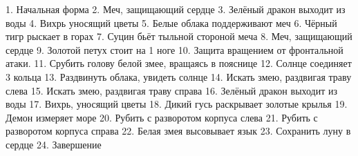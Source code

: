 1. Начальная форма
2. Меч, защищающий сердце
3. Зелёный дракон выходит из воды
4. Вихрь уносящий цветы
5. Белые облака поддерживают меч
6. Чёрный тигр рыскает в горах
7. Суцин бьёт тыльной стороной меча
8. Меч, защищающий сердце
9. Золотой петух стоит на 1 ноге
10. Защита вращением от фронтальной атаки.
11. Срубить голову белой змее, вращаясь в пояснице
12. Солнце соединяет 3 кольца
13. Раздвинуть облака, увидеть солнце
14. Искать змею, раздвигая траву слева
15. Искать змею, раздвигая траву справа
16. Зелёный дракон выходит из воды
17. Вихрь, уносящий цветы
18. Дикий гусь раскрывает золотые крылья
19. Демон измеряет море
20. Рубить с разворотом корпуса слева
21. Рубить с разворотом корпуса справа
22. Белая змея высовывает язык
23. Сохранить луну в сердце
24. Завершение
